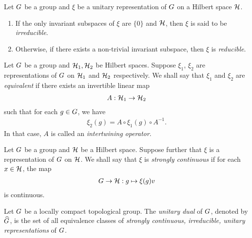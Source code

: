 \begin{definition}[Irreducibility]
\label{definition:irreducible_representations}
    Let $G$ be a group and $\xi$ be a unitary representation of $G$ on a Hilbert space $\mathcal{H}$.
    \begin{enumerate}
        \item If the only invariant subspaces of $\xi$ are $\{0\}$ and $\mathcal{H}$,
            then $\xi$ is said to be \emph{irreducible}.
        \item Otherwise, if there exists a non-trivial invariant subspace,
            then $\xi$ is \emph{reducible}.
    \end{enumerate}
\end{definition}

\begin{definition}
\label{definition:equivalent_representations}
    Let $G$ be a group and $\mathcal{H}_1, \mathcal{H}_2$ be Hilbert spaces.
    Suppose $\xi_1$, $\xi_2$ are representations of $G$ on $\mathcal{H}_1$ and $\mathcal{H}_2$ respectively.
    We shall say that $\xi_1$ and $\xi_2$ are \emph{equivalent}
    if there exists an invertible linear map
    \begin{align*}
        A : \mathcal{H}_1 \to \mathcal{H}_2
    \end{align*}
    such that for each $g \in G$, we have
    \begin{align*}
        \xi_2(g) = A \circ \xi_1(g) \circ A^{-1}.
    \end{align*}
    In that case, $A$ is called an \emph{intertwining operator}.
\end{definition}

\begin{definition}
\label{definition:strongly_continuous_representation}
    Let $G$ be a group and $\mathcal{H}$ be a Hilbert space.
    Suppose further that $\xi$ is a representation of $G$ on $\mathcal{H}$.
    We shall say that $\xi$ is \emph{strongly continuous}
    if for each $x \in \mathcal{H}$,
    the map
    \begin{align*}
        G \to \mathcal{H} : g \mapsto \xi(g) v
    \end{align*}
    is continuous.
\end{definition}

\begin{definition}
\label{definition:unitary_dual}
    Let $G$ be a locally compact topological group.
    The \emph{unitary dual} of $G$, denoted by ${\widehat{G}}$,
    is the set of all equivalence classes of
    \emph{strongly continuous, irreducible, unitary representations} of $G$.
\end{definition}

